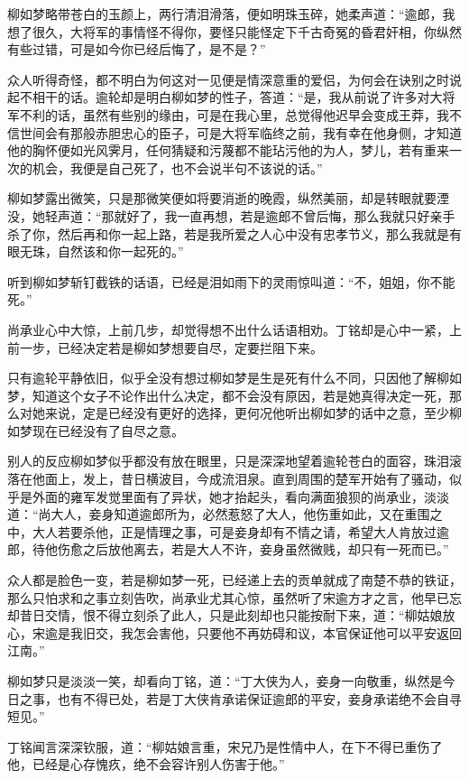 柳如梦略带苍白的玉颜上，两行清泪滑落，便如明珠玉碎，她柔声道：“逾郎，我想了很久，大将军的事情怪不得你，要怪只能怪定下千古奇冤的昏君奸相，你纵然有些过错，可是如今你已经后悔了，是不是？”

众人听得奇怪，都不明白为何这对一见便是情深意重的爱侣，为何会在诀别之时说起不相干的话。逾轮却是明白柳如梦的性子，答道：“是，我从前说了许多对大将军不利的话，虽然有些别的缘由，可是在我心里，总觉得他迟早会变成王莽，我不信世间会有那般赤胆忠心的臣子，可是大将军临终之前，我有幸在他身侧，才知道他的胸怀便如光风霁月，任何猜疑和污蔑都不能玷污他的为人，梦儿，若有重来一次的机会，我便是自己死了，也不会说半句不该说的话。”

柳如梦露出微笑，只是那微笑便如将要消逝的晚霞，纵然美丽，却是转眼就要湮没，她轻声道：“那就好了，我一直再想，若是逾郎不曾后悔，那么我就只好亲手杀了你，然后再和你一起上路，若是我所爱之人心中没有忠孝节义，那么我就是有眼无珠，自然该和你一起死的。”

听到柳如梦斩钉截铁的话语，已经是泪如雨下的灵雨惊叫道：“不，姐姐，你不能死。”

尚承业心中大惊，上前几步，却觉得想不出什么话语相劝。丁铭却是心中一紧，上前一步，已经决定若是柳如梦想要自尽，定要拦阻下来。

只有逾轮平静依旧，似乎全没有想过柳如梦是生是死有什么不同，只因他了解柳如梦，知道这个女子不论作出什么决定，都不会没有原因，若是她真得决定一死，那么对她来说，定是已经没有更好的选择，更何况他听出柳如梦的话中之意，至少柳如梦现在已经没有了自尽之意。

别人的反应柳如梦似乎都没有放在眼里，只是深深地望着逾轮苍白的面容，珠泪滚落在他面上，发上，昔日横波目，今成流泪泉。直到周围的楚军开始有了骚动，似乎是外面的雍军发觉里面有了异状，她才抬起头，看向满面狼狈的尚承业，淡淡道：“尚大人，妾身知道逾郎所为，必然惹怒了大人，他伤重如此，又在重围之中，大人若要杀他，正是情理之事，可是妾身却有不情之请，希望大人肯放过逾郎，待他伤愈之后放他离去，若是大人不许，妾身虽然微贱，却只有一死而已。”

众人都是脸色一变，若是柳如梦一死，已经递上去的贡单就成了南楚不恭的铁证，那么只怕求和之事立刻告吹，尚承业尤其心惊，虽然听了宋逾方才之言，他早已忘却昔日交情，恨不得立刻杀了此人，只是此刻却也只能按耐下来，道：“柳姑娘放心，宋逾是我旧交，我怎会害他，只要他不再妨碍和议，本官保证他可以平安返回江南。”

柳如梦只是淡淡一笑，却看向丁铭，道：“丁大侠为人，妾身一向敬重，纵然是今日之事，也有不得已处，若是丁大侠肯承诺保证逾郎的平安，妾身承诺绝不会自寻短见。”

丁铭闻言深深钦服，道：“柳姑娘言重，宋兄乃是性情中人，在下不得已重伤了他，已经是心存愧疚，绝不会容许别人伤害于他。”

